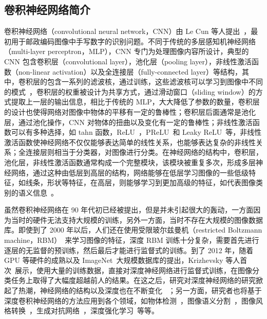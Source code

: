 \subsection{卷积神经网络简介}
卷积神经网络（convolutional neural network，CNN）由 Le Cun 等人提出~\cite{Lecun1990HandwrittenZC,LeCun1998GradientbasedLA}，最初用于邮政编码图像中手写数字的识别问题。不同于传统的多层感知机神经网络（multi-layer perceptron，MLP），CNN 专门为处理图像内容所设计，典型的 CNN 包含卷积层（convolutional layer），池化层（pooling layer），非线性激活函数（non-linear activation）以及全连接层（fully-connected layer）等结构，其中，卷积层的包含一系列的滤波核，通过训练，这些滤波核可以学习到图像中不同的模式~\cite{Zeiler2014VisualizingAU,Krizhevsky2012ImageNetCW}，卷积层的权重被设计为共享方式，通过滑动窗口（sliding window）的方式提取上一层的输出信息，相比于传统的 MLP，大大降低了参数的数量，卷积层的设计也使得网络对图像中物体的平移有一定的鲁棒性；卷积层后面通常是池化层，通过池化操作，CNN 对物体的扭曲以及变化有一定的鲁棒性；非线性激活函数可以有多种选择，如 tahn 函数，ReLU~\cite{Glorot2011DeepSR}，PReLU~\cite{He2015DelvingDI}和 Leaky ReLU~\cite{maas2013rectifier}等，非线性激活函数使神经网络不仅仅能够表达简单的线性关系，也能够表达复杂的非线性关系；全连接层则相当于分类器，对图像进行分类。在神经网络的结构中，卷积层，池化层，非线性激活函数通常构成一个完整模块，该模块被重复多次，形成多层神经网络，通过这种由低层到高层的结构，网络能够在低层学习图像的一些低级特征，如线条，形状等特征，在高层，则能够学习到更加高级的特征，如代表图像类别的语义信息~\cite{Krizhevsky2012ImageNetCW}。

虽然卷积神经网络在 90 年代初已经被提出，但是并未引起很大的轰动，一方面因为当时的硬件无法支持大规模的训练，另外一方面，当时不存在大规模的图像数据库。即使到了 2000 年以后，人们还在使用受限玻尔兹曼机（restricted Boltzmann machine，RBM）~\cite{Salakhutdinov2009DeepBM,Salakhutdinov2012AnEL}来学习图像的特征，深度 RBM 训练十分复杂，需要首先进行逐层的无监督的预训练，然后最后才能进行监督式的训练。到了 2012 年，随着 GPU 等硬件的成熟以及 ImageNet~\cite{Russakovsky2015ImageNetLS}大规模数据库的提出，Krizhevsky 等人首次~\cite{Krizhevsky2012ImageNetCW}展示，使用大量的训练数据，直接对深度神经网络进行监督式训练，在图像分类任务上取得了大幅度超越前人的结果。在这之后，研究对深度神经网络的研究掀起了热潮，神经网络的结构以及深度也在不断变化~
\cite{Zeiler2014VisualizingAU,Simonyan2014VeryDC,Szegedy2015GoingDW,He2016DeepRL,Huang2017DenselyCC}；另一方面，研究者也将基于深度卷积神经网络的方法应用到各个领域，如物体检测~\cite{Liu2016SSDSS,Redmon2016YouOL,Lin2017FocalLF,Ren2017FasterRT}，图像语义分割~\cite{Shelhamer2017FullyCN,Chen2018DeepLabSI,Noh2015LearningDN}，图像风格转换~\cite{Gatys2016ImageST,Johnson2016PerceptualLF}，生成对抗网络~\cite{Goodfellow2014GenerativeAN,Mirza2014ConditionalGA}，深度强化学习~\cite{Mnih2015HumanlevelCT,Silver2016MasteringTG}等等。


